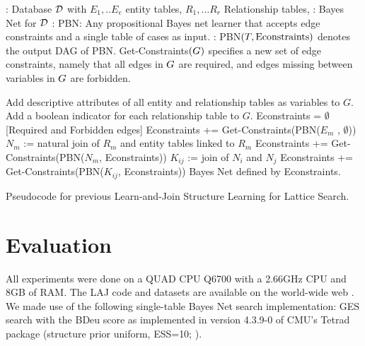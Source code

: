 \documentclass{article}
\begin{document}
\begin{algorithm}[htb]
\begin{algorithmic}
{\footnotesize
{}: Database $\mathcal{D}$ with $E_1,..E_e$ entity tables, $R_1,... R_r$ Relationship tables, %
: Bayes Net for $\mathcal{D}$ 
: PBN: Any propositional Bayes net learner that accepts edge constraints and a single table of cases as input. 
: PBN$(T,\mbox{Econstraints})$ denotes the output DAG of PBN. Get-Constraints$(G)$ specifies a new set of edge constraints, namely that all edges in $G$ are required, and edges missing between variables in $G$ are forbidden.
} %
\end{algorithmic}
\begin{algorithmic}[1]
{\footnotesize
	\STATE Add descriptive attributes of all entity and relationship tables as variables to  $G$. Add a boolean indicator for each relationship table to $G$.
	\STATE Econstraints = $\emptyset$ {[Required and Forbidden edges]} %
	\STATE Econstraints += Get-Constraints(PBN($E_m$ , $\emptyset$)) 
	\ENDFOR	
{}
	\STATE $N_m$ :=  natural 
	join of $R_m$ and entity tables linked to $R_m$ 
	\STATE Econstraints += Get-Constraints(PBN($N_m$, Econstraints))
\ENDFOR
{}
	\STATE $K_{ij}$ :=  %
	join of $N_i$ and $N_j$ 
	\STATE Econstraints += Get-Constraints(PBN($K_{ij}$, Econstraints))
\ENDFOR
\RETURN Bayes Net defined by Econstraints.
		} %
\end{algorithmic}
\caption{Pseudocode for previous Learn-and-Join Structure Learning for Lattice Search. \label{alg:structure}}
\end{algorithm}



\section{Evaluation} 
All experiments were done on a QUAD CPU Q6700 with a 2.66GHz CPU and 8GB of RAM. The LAJ code and datasets are available on the world-wide web \cite{bib:jbnsite}. We made use of the following single-table Bayes Net search implementation:  GES search \cite{Chickering2003} with the BDeu score as implemented in version 4.3.9-0 of CMU's Tetrad package (structure prior uniform, ESS=10; \cite{2008a}).
\end{document}
